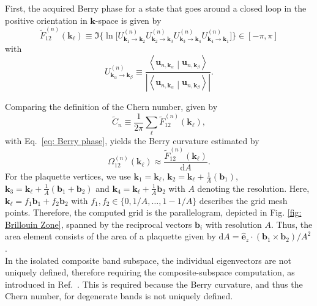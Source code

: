 First, the acquired Berry phase for a state that goes around a closed loop in the positive orientation in $\mathbf{k}$-space is given by
\begin{equation}
    \tilde{F}_{12}^{(n)}(\mathbf{k}_\ell) \equiv  \Im\Big\{\ln \big[ U_{\mathbf{k}_1 \to \mathbf{k}_2}^{(n)} U_{\mathbf{k}_2 \to \mathbf{k}_3}^{(n)} U_{\mathbf{k}_3 \to \mathbf{k}_4}^{(n)} U_{\mathbf{k}_4 \to \mathbf{k}_1}^{(n)}\big]\Big\}\in[-\pi, \pi]
    \label{eq: berry curv comp1}
\end{equation}
with
\begin{equation}
    U_{\mathbf{k}_\alpha \to \mathbf{k}_\beta}^{(n)} \equiv 
    \frac{\left\langle \mathbf{u}_{n,\mathbf{k}_\alpha} \middle| \mathbf{u}_{n,\mathbf{k}_\beta} \right\rangle}
    {\left| \left\langle \mathbf{u}_{n,\mathbf{k}_\alpha} \middle| \mathbf{u}_{n,\mathbf{k}_\beta} \right\rangle \right|}.
    \label{eq: berry curv operator U1}
\end{equation}

Comparing the definition of the Chern number, given by
\begin{equation}
    \tilde{C}_n \equiv \frac{1}{2\pi} \sum_{\ell} \tilde{F}_{12}^{(n)}(\mathbf{k}_{\ell}),
    \label{eq: chern comp}
\end{equation}
with Eq.~\eqref{eq: Berry phase}, yields the Berry curvature estimated by
\begin{equation}
    \label{eq: berry curv computation}
    \Omega_{12}^{(n)}(\mathbf{k}_{\ell})   \approx \frac{ \tilde{F}^{(n)}_{12}(\mathbf{k}_{\ell}) } {\text{d}A}.
\end{equation}
For the plaquette vertices, we use $\mathbf{k}_1= \mathbf{k}_\ell$, $\mathbf{k}_2 = \mathbf{ k}_\ell + \frac{1}{A}(\mathbf{b}_1)$, $\mathbf{k}_3 = \mathbf{ k}_\ell + \frac{1}{A}(\mathbf{b}_1+\mathbf{b}_2)$ and $\mathbf{k}_4 = \mathbf{ k}_\ell + \frac{1}{A}\mathbf{b}_2$ with $A$ denoting the resolution. Here, $\mathbf{k}_\ell = f_1\mathbf{b}_1 + f_2\mathbf{b}_2$ with $f_1,f_2\in \{0,1/A,\dots,1-1/A\}$ describes the grid mesh points. Therefore, the computed grid is the parallelogram,  depicted in Fig. \ref{fig: Brillouin Zone}, spanned by the reciprocal vectors $\mathbf{b}_i$ with resolution $A$. Thus, the area element consists of the area of a plaquette given by $\text{d}A = \bm{\hat{e}}_z \cdot(\mathbf{b}_1 \times \mathbf{b}_2)/A^2$.\\
In the isolated composite band subspace, the individual eigenvectors are not uniquely defined, therefore requiring the composite-subspace computation, as introduced in Ref.~\cite{Zhao:20}. This is required because the Berry curvature, and thus the Chern number, for degenerate bands is not uniquely defined.\\

